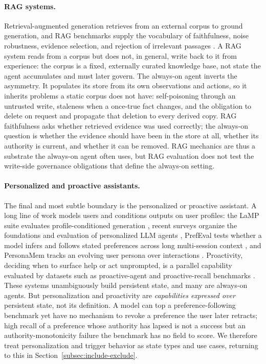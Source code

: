 \paragraph{RAG systems.} Retrieval-augmented generation retrieves from an external corpus to ground generation, and RAG benchmarks supply the vocabulary of faithfulness, noise robustness, evidence selection, and rejection of irrelevant passages \citep{chen2023benchmarkinglargelanguagemodels}. A RAG system reads from a corpus but does not, in general, write back to it from experience: the corpus is a fixed, externally curated knowledge base, not state the agent accumulates and must later govern. The always-on agent inverts the asymmetry. It populates its store from its own observations and actions, so it inherits problems a static corpus does not have: self-poisoning through an untrusted write, staleness when a once-true fact changes, and the obligation to delete on request and propagate that deletion to every derived copy. RAG faithfulness asks whether retrieved evidence was used correctly; the always-on question is whether the evidence should have been in the store at all, whether its authority is current, and whether it can be removed. RAG mechanics are thus a substrate the always-on agent often uses, but RAG evaluation does not test the write-side governance obligations that define the always-on setting.

\paragraph{Personalized and proactive assistants.} The final and most subtle boundary is the personalized or proactive assistant. A long line of work models users and conditions outputs on user profiles: the LaMP suite evaluates profile-conditioned generation \citep{salemi-etal-2024-lamp}, recent surveys organize the foundations and evaluation of personalized LLM agents \citep{xu2026personalizedllmpoweredagentsfoundations}, PrefEval tests whether a model infers and follows stated preferences across long multi-session context \citep{zhao2025prefeval}, and PersonaMem tracks an evolving user persona over interactions \citep{jiang2025personamem}. Proactivity, deciding when to surface help or act unprompted, is a parallel capability evaluated by datasets such as proactive-agent and proactive-recall benchmarks \citep{lu2024proactiveagent,he2024madialbench}. These systems unambiguously build persistent state, and many are always-on agents. But personalization and proactivity are \emph{capabilities expressed over} persistent state, not its definition. A model can top a preference-following benchmark yet have no mechanism to revoke a preference the user later retracts; high recall of a preference whose authority has lapsed is not a success but an authority-monotonicity failure the benchmark has no field to score. We therefore treat personalization and trigger behavior as state types and use cases, returning to this in Section~\ref{subsec:include-exclude}.

